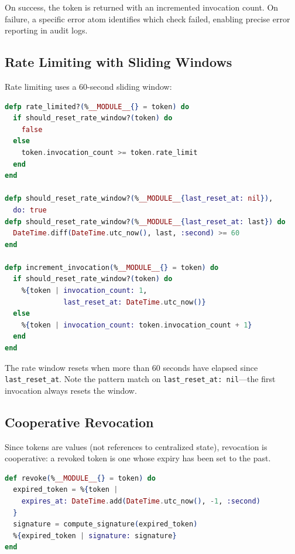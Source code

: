 \documentclass[12pt,a4paper]{article}
\theoremstyle{plain}
\theoremstyle{definition}
\begin{document}
On success, the token is returned with an incremented invocation count. On failure, a specific error atom identifies which check failed, enabling precise error reporting in audit logs.

\subsection{Rate Limiting with Sliding Windows}

Rate limiting uses a 60-second sliding window:

\begin{lstlisting}[language=elixir, caption={Rate limiting with window reset.}, label={lst:rate-limit}]
defp rate_limited?(%__MODULE__{} = token) do
  if should_reset_rate_window?(token) do
    false
  else
    token.invocation_count >= token.rate_limit
  end
end

defp should_reset_rate_window?(%__MODULE__{last_reset_at: nil}),
  do: true
defp should_reset_rate_window?(%__MODULE__{last_reset_at: last}) do
  DateTime.diff(DateTime.utc_now(), last, :second) >= 60
end

defp increment_invocation(%__MODULE__{} = token) do
  if should_reset_rate_window?(token) do
    %{token | invocation_count: 1,
              last_reset_at: DateTime.utc_now()}
  else
    %{token | invocation_count: token.invocation_count + 1}
  end
end
\end{lstlisting}

The rate window resets when more than 60 seconds have elapsed since \texttt{last\_reset\_at}. Note the pattern match on \texttt{last\_reset\_at: nil}---the first invocation always resets the window.

\subsection{Cooperative Revocation}

Since tokens are values (not references to centralized state), revocation is cooperative: a revoked token is one whose expiry has been set to the past.

\begin{lstlisting}[language=elixir, caption={Cooperative token revocation.}, label={lst:revoke}]
def revoke(%__MODULE__{} = token) do
  expired_token = %{token |
    expires_at: DateTime.add(DateTime.utc_now(), -1, :second)
  }
  signature = compute_signature(expired_token)
  %{expired_token | signature: signature}
end
\end{lstlisting}
\end{document}
